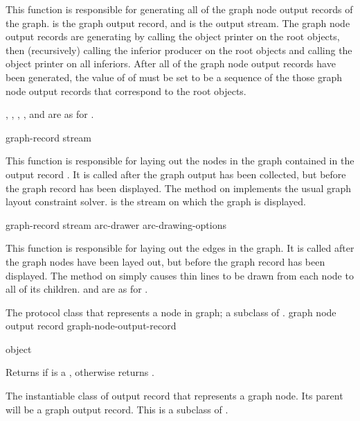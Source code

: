 This function is responsible for generating all of the graph node output records
of the graph.   is the graph output record, and 
is the output stream.  The graph node output records are generating by calling
the object printer on the root objects, then (recursively) calling the inferior
producer on the root objects and calling the object printer on all inferiors.
After all of the graph node output records have been generated, the value of
 of  must be set to be a sequence of the
those graph node output records that correspond to the root objects.

, , ,
, and  are as for
.

 {graph-record stream}

This function is responsible for laying out the nodes in the graph contained in
the output record .  It is called after the graph output has
been collected, but before the graph record has been displayed.  The method on
 implements the usual graph layout constraint
solver.   is the stream on which the graph is displayed.

 {graph-record stream arc-drawer arc-drawing-options}

This function is responsible for laying out the edges in the graph.  It is
called after the graph nodes have been layed out, but before the graph record
has been displayed.  The method on  simply
causes thin lines to be drawn from each node to all of its children.
 and  are as for .



The protocol class that represents a node in graph; a subclass of
.
 {graph node output record} {graph-node-output-record}

 {object}

Returns  if  is a ,
otherwise returns .


The instantiable class of output record that represents a graph node.  Its
parent will be a graph output record.  This is a subclass of
.


